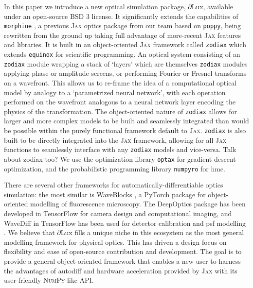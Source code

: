 \documentclass[]{spieman}
\newcommand\jax{\textsc{Jax}\xspace}
\newcommand\dlux{$\partial$Lux\xspace}
\newcommand\equinox{\texttt{equinox}\xspace}
\newcommand\zodiax{\texttt{zodiax}\xspace}
\newcommand\optax{\texttt{optax}\xspace}
\newcommand\numpyro{\texttt{numpyro}\xspace}
\begin{document}
In this paper we introduce a new optical simulation package, \dlux, available under an open-source BSD 3 license. It significantly extends the capabilities of \texttt{morphine} \cite{pope2021,phase_ret_and_design}, a previous \jax optics package from our team based on \texttt{poppy}, being rewritten from the ground up taking full advantage of more-recent \jax features and libraries.  It is built in an object-oriented \jax framework called \zodiax which extends \equinox \cite{kidger2021equinox} for scientific programming. An optical system consisting of an \zodiax module wrapping a stack of `layers' which are themselves \zodiax modules applying phase or amplitude screens, or performing Fourier or Fresnel transforms on a wavefront. This allows us to re-frame the idea of a computational optical model by analogy to a `parametrized neural network', with each operation performed on the wavefront analogous to a neural network layer encoding the physics of the transformation. The object-oriented nature of \zodiax allows for larger and more complex models to be built and seamlessly integrated than would be possible within the purely functional framework default to \jax. \zodiax is also built to be directly integrated into the \jax framework, allowing for all \jax functions to seamlessly interface with any \zodiax models and vice-versa. Talk about zodiax too? We use the optimization library \optax \cite{optax2020github} for gradient-descent optimization, and the probabilistic programming library \numpyro \cite{Phan2019} for \ac{hmc}.

There are several other frameworks for automatically-differentiable optics simulation:
the most similar is WaveBlocks \cite{page2020}, a PyTorch package for object-oriented modelling of fluorescence microscopy. 
The DeepOptics package \cite{sitzmann2018} has been developed in TensorFlow for camera design and computational imaging, and
WaveDiff in TensorFlow has been used for detector calibration \cite{liaudat2021} and \ac{psf} modelling \cite{Liaudat2022}. 
We believe that \dlux fills a unique niche in this ecosystem as the most general modelling framework for physical optics. This has driven a design focus on flexibility and ease of open-source contribution and development. The goal is to provide a general object-oriented framework that enables a new user to harness the advantages of autodiff and hardware acceleration provided by \jax with its user-friendly \textsc{NumPy}-like API.

\end{document}
